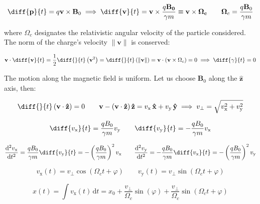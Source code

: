 \begin{equation}
    \diff{\mathbf{p}}{t}=q\mathbf{v}\times\mathbf{B}_0\implies\diff{\mathbf{v}}{t}=\mathbf{v}\times\frac{q\mathbf{B_0}}{\gamma m}\equiv\mathbf{v}\times\mathbf{\Omega_c}\quad\quad\mathbf{\Omega}_c=\frac{q\mathbf{B}_0}{\gamma m}
\end{equation}

where $\Omega_c$ designates the relativistic angular velocity of the particle considered. The norm of the charge's velocity $\|\mathbf{v}\|$ is conserved:

\begin{equation}
    \mathbf{v}\cdot\diff{\mathbf{v}}{t}=\frac{1}{2}\diff{}{t}\left(\mathbf{v}^2\right)=\diff{}{t}\left(\|\mathbf{v}\|\right)=\mathbf{v}\cdot\left(\mathbf{v}\times\Omega_c\right)=0\implies\diff{\gamma}{t}=0
\end{equation}

The motion along the magnetic field is uniform. Let us choose $\mathbf{B}_0$ along the $\mathbf{\hat{z}}$ axis, then:

\begin{equation}
    \diff{}{t}\left(\mathbf{v}\cdot\mathbf{\hat{z}}\right)=0\quad\quad\mathbf{v}-(\mathbf{v}\cdot\mathbf{\hat{z}})\,\mathbf{\hat{z}}=v_\mathrm{x}\,\mathbf{\hat{x}}+v_\mathrm{y}\,\mathbf{\hat{y}}\implies v_\perp=\sqrt{v_\mathrm{x}^2+v_\mathrm{y}^2}
\end{equation}

\begin{equation}
    \diff{v_\mathrm{x}}{t}=\frac{qB_0}{\gamma m}v_\mathrm{y}\qquad\diff{v_\mathrm{y}}{t}=-\frac{qB_0}{\gamma m}v_\mathrm{x}
\end{equation}

\begin{equation}
    \frac{\mathrm{d}^2v_\mathrm{x}}{\mathrm{d}t^2}=\frac{qB_0}{\gamma m}\diff{v_\mathrm{y}}{t}=-\left(\frac{qB_0}{\gamma m}\right)^2v_\mathrm{x}\qquad\frac{\mathrm{d}^2v_\mathrm{y}}{\mathrm{d}t^2}=-\frac{qB_0}{\gamma m}\diff{v_\mathrm{x}}{t}=-\left(\frac{qB_0}{\gamma m}\right)^2v_\mathrm{y}
\end{equation}

\begin{equation}
    v_\mathrm{x}(t)=v_\perp\cos(\Omega_ct+\varphi)\qquad v_\mathrm{y}(t)=v_\perp\sin(\Omega_ct+\varphi)
\end{equation}

\begin{equation}
    x(t)=\int v_\mathrm{x}(t)\,\mathrm{d}t=x_0+\frac{v_\perp}{\Omega_c}\sin(\varphi)+\frac{v_\perp}{\Omega_c}\sin(\Omega_ct+\varphi)
\end{equation}


